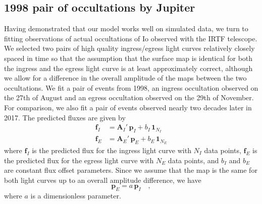\documentclass[modern]{aastex62}
\begin{document}
\subsection{1998 pair of occultations by Jupiter}
Having demonstrated that our model works well on simulated data, we turn to fitting observations of actual occultations of Io observed with the IRTF telescope.
We selected two pairs of high quality ingress/egress light curves relatively closely spaced in time so that the assumption that the surface map is identical for both the ingress and the egress light curve is at least approximately correct, although we allow for a difference in the overall amplitude of the maps between the two occultations.
We fit a pair of events from 1998, an ingress occultation observed on the 27th of August and an egress occultation observed on the 29th of November.
For comparison, we also fit a pair of events observed nearly two decades later in 2017.
The predicted fluxes are given by 
\begin{align}
    \mathbf{f}_I&=\mathbf{A}_I'\,\mathbf{p}_I +b_I\,\mathbf{1}_{N_I}\\
    \mathbf{f}_E&=\mathbf{A}_E'\,\mathbf{p}_E +b_E\,\mathbf{1}_{N_E}
\end{align}
where $\mathbf{f}_I$ is the predicted flux for the ingress light curve with $N_I$ data points, $\mathbf{f}_E$ is the predicted flux for the egress light curve with $N_E$ data points, and $b_I$ and $b_E$ are constant flux offset parameters.
Since we assume that the map is the same for both light curves up to an overall amplitude difference, we have
\begin{equation}
    \mathbf{p}_E=a\,\mathbf{p}_I
    \quad,
\end{equation}
where $a$ is a dimensionless parameter.
\end{document}
